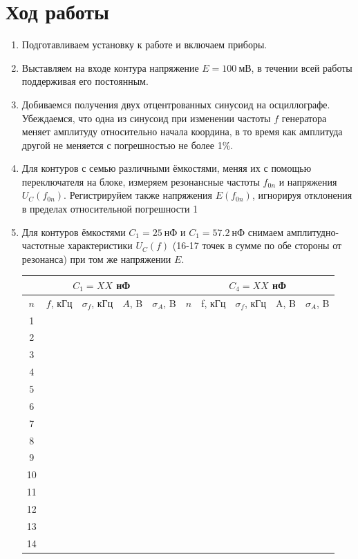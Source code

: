 \documentclass[a4paper, 12pt]{article}%
\begin{document}
\section{Ход работы}
\begin{enumerate}
\item Подготавливаем установку к работе и включаем приборы.
\item Выставляем на входе контура напряжение $E = 100~\text{мВ}$, в течении всей работы поддерживая его постоянным.
\item Добиваемся получения двух отцентрованных синусоид на осциллографе. Убеждаемся, что одна из синусоид при изменении частоты $f$ генератора меняет амплитуду относительно начала координа, в то время как амплитуда другой не меняется с погрешностью не более 1\%.
\item Для контуров с семью различными ёмкостями, меняя их с помощью переключателя на
блоке, измеряем резонансные частоты $f_{0n}$ и напряжения $U_C(f_{0n})$. Регистрируйем также
напряжения $E(f_{0n})$, игнорируя отклонения в пределах относительной погрешности 1%
\item Для контуров ёмкостями $C_1 = 25~\text{нФ}$ и $C_1 = 57.2~\text{нФ}$ снимаем амплитудно-частотные характеристики $U_C(f)$ (16-17 точек
в сумме по обе стороны от резонанса) при том же напряжении $E$.


\begin{table}[h]
\begin{tabular}{|c|c|c|c|c||c|c|c|c|c|}
\hline \multicolumn{5}{|c||}{$C_{1}=XX$ нФ} & \multicolumn{5}{c|}{$C_{4}=XX$ нФ } \\
\hline$n$ & $f$, кГц & $\sigma_{f}$, кГц & $A$, B & $\sigma_{A}$, B & $n$ & f, кГц & $\sigma_{f}$, кГц & A, B & $\sigma_{A}$, B \\
\hline 1   &  &  &  &  &  &  &  &  &  \\
\hline 2   &  &  &  &  &  &  &  &  &  \\
\hline 3   &  &  &  &  &  &  &  &  &  \\
\hline 4   &  &  &  &  &  &  &  &  &  \\
\hline 5   &  &  &  &  &  &  &  &  &  \\
\hline 6   &  &  &  &  &  &  &  &  &  \\
\hline 7   &  &  &  &  &  &  &  &  &  \\
\hline 8   &  &  &  &  &  &  &  &  &  \\
\hline 9   &  &  &  &  &  &  &  &  &  \\
\hline 10  &  &  &  &  &  &  &  &  &  \\
\hline 11  &  &  &  &  &  &  &  &  &  \\
\hline 12  &  &  &  &  &  &  &  &  &  \\
\hline 13  &  &  &  &  &  &  &  &  &  \\
\hline 14  &  &  &  &  &  &  &  &  &  \\


\end{tabular}
\end{table}
\end{enumerate}
\end{document}
